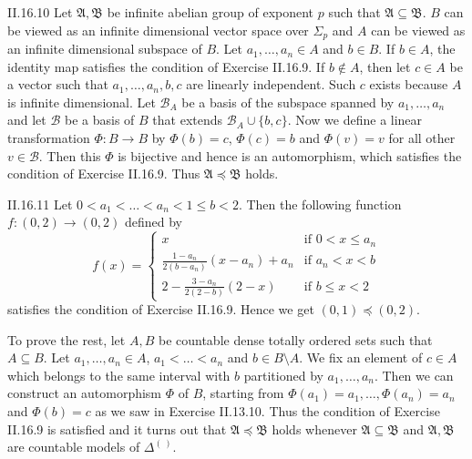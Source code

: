 \documentclass[12pt]{article}
\begin{document}
\begin{customthm}{II.16.10}
  Let $\mathfrak{A},\mathfrak{B}$ be infinite abelian group of exponent $p$ such that $\mathfrak{A}\subseteq\mathfrak{B}$. $B$ can be viewed as an infinite dimensional vector space over $\Sigma_p$ and $A$ can be viewed as an infinite dimensional subspace of $B$. Let $a_1,\ldots,a_n\in A$ and $b\in B$. If $b\in A$, the identity map satisfies the condition of Exercise II.16.9. If $b\not\in A$, then let $c\in A$ be a vector such that $a_1,\ldots,a_n,b,c$ are linearly independent. Such $c$ exists because $A$ is infinite dimensional. Let $\mathcal{B}_A$ be a basis of the subspace spanned by $a_1,\ldots,a_n$ and let $\mathcal{B}$ be a basis of $B$ that extends $\mathcal{B}_A\cup\{b,c\}$. Now we define a linear transformation $\Phi:B\rightarrow B$ by $\Phi(b)=c$, $\Phi(c)=b$ and $\Phi(v)=v$ for all other $v\in\mathcal{B}$. Then this $\Phi$ is bijective and hence is an automorphism, which satisfies the condition of Exercise II.16.9. Thus $\mathfrak{A}\preccurlyeq\mathfrak{B}$ holds.
\end{customthm}

\begin{customthm}{II.16.11}
  Let $0<a_1<\ldots<a_n<1\leq b<2$. Then the following function $f:(0,2)\rightarrow(0,2)$ defined by
  \[
    f(x)=
    \begin{cases}
      x & \text{if } 0<x\leq a_n \\
      \frac{1-a_n}{2(b-a_n)}(x-a_n)+a_n & \text{if } a_n<x<b \\
      2-\frac{3-a_n}{2(2-b)}(2-x) & \text{if } b\leq x<2
    \end{cases}
  \]
  satisfies the condition of Exercise II.16.9. Hence we get $(0,1)\preccurlyeq(0,2)$.

  To prove the rest, let $A,B$ be countable dense totally ordered sets such that $A\subseteq B$. Let $a_1,\ldots,a_n\in A$, $a_1<\ldots<a_n$ and $b\in B\setminus A$. We fix an element of $c\in A$ which belongs to the same interval with $b$ partitioned by $a_1,\ldots,a_n$. Then we can construct an automorphism $\Phi$ of $B$, starting from $\Phi(a_1)=a_1,\ldots,\Phi(a_n)=a_n$ and $\Phi(b)=c$ as we saw in Exercise II.13.10. Thus the condition of Exercise II.16.9 is satisfied and it turns out that $\mathfrak{A}\preccurlyeq\mathfrak{B}$ holds whenever $\mathfrak{A}\subseteq\mathfrak{B}$ and $\mathfrak{A},\mathfrak{B}$ are countable models of $\Delta^{(~)}$.
\end{customthm}
\end{document}
